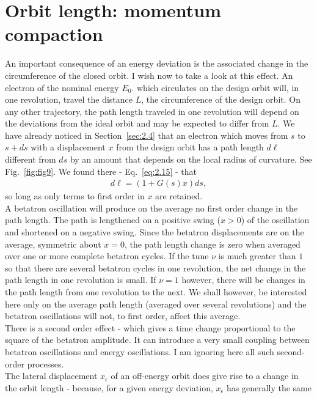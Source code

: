 \documentclass[../sands-adaptation.tex]{subfiles}
\begin{document}
\section{Orbit length: momentum compaction}\label{sec:3.2}

An important consequence of an energy deviation is the associated change in the circumference
 of the closed orbit. I wish now to take a look at this effect. An electron of the nominal energy $E_0$. which circulates on the design orbit will, in one revolution, travel the distance $L$, the circumference of the design orbit. On any other trajectory, the path length traveled in one revolution will depend on the deviations from the ideal orbit and may be expected to differ from $L$. We have already noticed in Section~\ref{sec:2.4} that an electron which moves from $s$ to $s + ds$ with a displacement $x$ from the design orbit has a path length $d\ell$ different from $ds$ by an amount that depends on the local radius of curvature. See Fig.~\ref{fig:fig9}. We found there - Eq.~\eqref{eq:2.15} - that
\begin{align} \label{eq:3.7}
	d\ell = (1 + G(s)x) ds,
\end{align}
so long as only terms to first order in $x$ are retained.\\
A betatron oscillation will produce on the average no first order change in the path length. The path is lengthened on a positive swing ($x > 0$) of the oscillation and shortened on a negative swing. Since the betatron displacements are on the average, symmetric about $x = 0$, the path length change is zero when averaged over one or more complete betatron cycles. If the tune $\nu$ is much greater than $1$ so that there are several betatron cycles in one revolution, the net
change in the path length in one revolution is small. If $\nu = 1$ however, there will be changes in the path length from one revolution to the next. We shall however, be interested here only on the average path length (averaged over several revolutions) and the betatron oscillations will not, to first order, affect this average.\\
There is a second order effect - which gives a time change proportional to the square of the betatron amplitude. It can introduce a very small coupling between betatron oscillations
 and energy oscillations. I am ignoring here all such second-order processes.\\
 The lateral displacement $x_\epsilon$ of an off-energy orbit does give rise to a change in
the orbit length - because, for a given energy deviation, $x_\epsilon$ has generally the same
\end{document}
